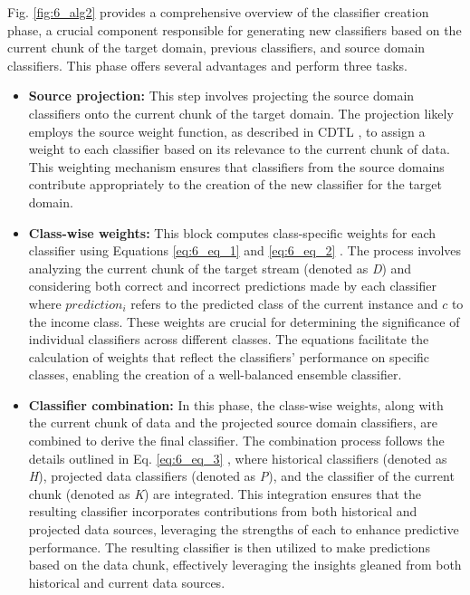 Fig. \ref{fig:6_alg2} provides a comprehensive overview of the classifier creation phase, a crucial component responsible for generating new classifiers based on the current chunk of the target domain, previous classifiers, and source domain classifiers. This phase offers several advantages and perform three tasks. \begin{itemize}
	\item \textbf{Source projection:} This step involves projecting the source domain classifiers onto the current chunk of the target domain. The projection likely employs the source weight function, as described in CDTL \cite{yang2021concept}, to assign a weight to each classifier based on its relevance to the current chunk of data. This weighting mechanism ensures that classifiers from the source domains contribute appropriately to the creation of the new classifier for the target domain.
	\item \textbf{Class-wise weights:} This block computes class-specific weights for each classifier using Equations \ref{eq:6_eq_1} and \ref{eq:6_eq_2} . The process involves analyzing the current chunk of the target stream (denoted as \emph{D}) and considering both correct and incorrect predictions made by each classifier where $prediction_i$ refers to the predicted class of the current instance and $c$ to the income class. These weights are crucial for determining the significance of individual classifiers across different classes. The equations facilitate the calculation of weights that reflect the classifiers' performance on specific classes, enabling the creation of a well-balanced ensemble classifier.
	\item \textbf{Classifier combination:} In this phase, the class-wise weights, along with the current chunk of data and the projected source domain classifiers, are combined to derive the final classifier. The combination process follows the details outlined in Eq. \ref{eq:6_eq_3} , where historical classifiers (denoted as \emph{H}), projected data classifiers (denoted as \emph{P}), and the classifier of the current chunk (denoted as \emph{K}) are integrated. This integration ensures that the resulting classifier incorporates contributions from both historical and projected data sources, leveraging the strengths of each to enhance predictive performance. The resulting classifier is then utilized to make predictions based on the data chunk, effectively leveraging the insights gleaned from both historical and current data sources.
\end{itemize}

